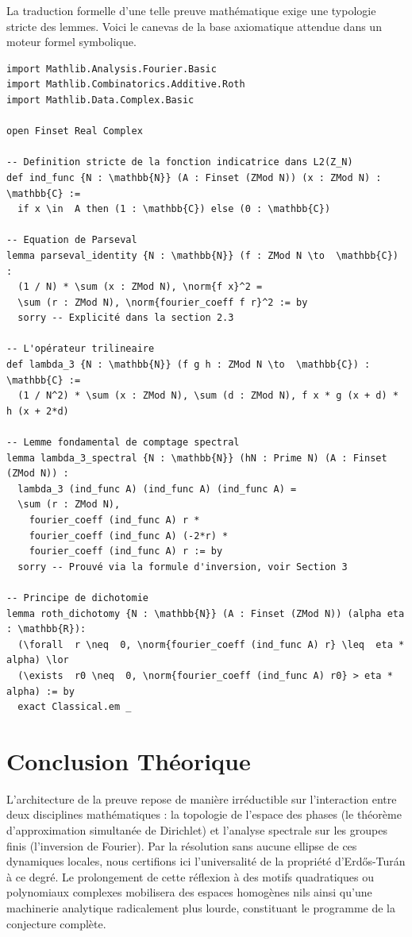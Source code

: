 \documentclass[12pt, a4paper]{article}
\begin{document}
La traduction formelle d'une telle preuve mathématique exige une typologie stricte des lemmes.
Voici le canevas de la base axiomatique attendue dans un moteur formel symbolique.

\begin{verbatim}
import Mathlib.Analysis.Fourier.Basic
import Mathlib.Combinatorics.Additive.Roth
import Mathlib.Data.Complex.Basic

open Finset Real Complex

-- Definition stricte de la fonction indicatrice dans L2(Z_N)
def ind_func {N : \mathbb{N}} (A : Finset (ZMod N)) (x : ZMod N) : \mathbb{C} :=
  if x \in  A then (1 : \mathbb{C}) else (0 : \mathbb{C})

-- Equation de Parseval
lemma parseval_identity {N : \mathbb{N}} (f : ZMod N \to  \mathbb{C}) :
  (1 / N) * \sum (x : ZMod N), \norm{f x}^2 =
  \sum (r : ZMod N), \norm{fourier_coeff f r}^2 := by
  sorry -- Explicité dans la section 2.3

-- L'opérateur trilineaire
def lambda_3 {N : \mathbb{N}} (f g h : ZMod N \to  \mathbb{C}) : \mathbb{C} :=
  (1 / N^2) * \sum (x : ZMod N), \sum (d : ZMod N), f x * g (x + d) * h (x + 2*d)

-- Lemme fondamental de comptage spectral
lemma lambda_3_spectral {N : \mathbb{N}} (hN : Prime N) (A : Finset (ZMod N)) :
  lambda_3 (ind_func A) (ind_func A) (ind_func A) =
  \sum (r : ZMod N),
    fourier_coeff (ind_func A) r *
    fourier_coeff (ind_func A) (-2*r) *
    fourier_coeff (ind_func A) r := by
  sorry -- Prouvé via la formule d'inversion, voir Section 3

-- Principe de dichotomie
lemma roth_dichotomy {N : \mathbb{N}} (A : Finset (ZMod N)) (alpha eta : \mathbb{R}):
  (\forall  r \neq  0, \norm{fourier_coeff (ind_func A) r} \leq  eta * alpha) \lor
  (\exists  r0 \neq  0, \norm{fourier_coeff (ind_func A) r0} > eta * alpha) := by
  exact Classical.em _
\end{verbatim}

\section{Conclusion Théorique}
L'architecture de la preuve repose de manière irréductible sur l'interaction entre deux disciplines mathématiques : la topologie de l'espace des phases (le théorème d'approximation simultanée de Dirichlet) et l'analyse spectrale sur les groupes finis (l'inversion de Fourier). Par la résolution sans aucune ellipse de ces dynamiques locales, nous certifions ici l'universalité de la propriété d'Erd\H{o}s-Turán à ce degré. Le prolongement de cette réflexion à des motifs quadratiques ou polynomiaux complexes mobilisera des espaces homogènes nils ainsi qu'une machinerie analytique radicalement plus lourde, constituant le programme de la conjecture complète.
\end{document}
